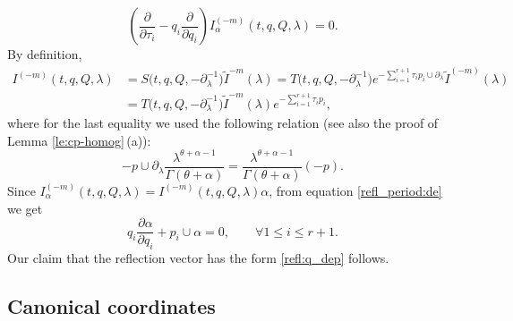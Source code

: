 \documentclass[10pt,a4paper]{article}
\numberwithin{equation}{section}
\begin{document}
\begin{equation}\label{refl_period:de}
\left(
\frac{\partial}{\partial \tau_i} - q_i\frac{\partial}{\partial q_i}
\right) I^{(-m)}_\alpha(t,q,Q,\lambda) =0.
\end{equation}
By definition,
\begin{align*}
I^{(-m)}(t,q,Q,\lambda)&=
S\big(t,q,Q,-\partial_\lambda^{-1}\big) \widetilde I^{-m}(\lambda)=T\big(t,q,Q,-\partial_\lambda^{-1}\big)
e^{-\sum^{r+1}_{i=1}\tau_i p_i\cup\partial_\lambda} \widetilde I^{(-m)}(\lambda)\\
&=T\big(t,q,Q,-\partial_\lambda^{-1}\big)
\widetilde I^{-m}(\lambda) e^{-\sum^{r+1}_{i=1}\tau_i p_i},
\end{align*}
where for the last equality we used the following relation (see also the proof of Lemma \ref{le:cp-homog}\,(a)):
\[
-p\cup \partial_\lambda
\frac{\lambda^{\theta+\alpha-1}}{\Gamma(\theta+\alpha)} =
\frac{\lambda^{\theta+\alpha-1}}{\Gamma(\theta+\alpha)} (-p).
\]
Since $I_\alpha^{(-m)}(t,q,Q,\lambda) =I^{(-m)}(t,q,Q,\lambda) \alpha$, from equation \eqref{refl_period:de} we get
\[
q_i\frac{\partial \alpha}{\partial q_i} + p_i\cup \alpha =0,\qquad
\forall 1\leq i\leq r+1.
\]
Our claim that the reflection vector has the form \eqref{refl:q_dep} follows.


\subsection{Canonical coordinates}\label{sec:can_coords}
\end{document}
